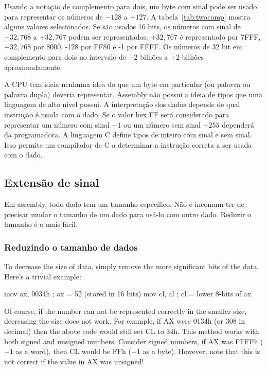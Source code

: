 Usando a notação de complemento para dois, um byte com sinal pode ser usado para
representar os números de $-128$ a $+127$. A tabela~\ref{tab:twocomp} mostra alguns
valores selecionados. Se são usados 16 bits, os números com sinal de $-32,768$ a 
$+32,767$ podem ser representados. $+32,767$ é representado por 7FFF, 
$-32,768$ por 8000, -128 por FF80 e -1 por FFFF. Os números de 32 bit em complemento 
para dois no intervalo de $-2$ bilhões a $+2$ bilhões aproximadamente. 


A CPU tem ideia nenhuma idea do que um byte em particular (ou palavra ou palavra dupla) 
deveria representar. Assembly não possui a ideia de tipos que uma
linguagem de alto nível possui. A interpretação dos dados depende de qual instrução
é usada com o dado. Se o valor hex FF será considerado para representar
um número com sinal $-1$ ou um número sem sinal $+255$ dependerá da programadora. A linguagem C 
define tipos de inteiro com sinal e sem sinal. Isso permite um compilador de C a 
determinar a instrução correta a ser usada com o dado.


\subsection{Extensão de sinal }

Em assembly, todo dado tem um tamanho específico. Não é incomum ter de precisar 
mudar o tamanho de um dado para usá-lo com outro dado. Reduzir o tamanho é o 
mais fácil.

\subsubsection{Reduzindo o tamanho de dados}

To decrease the size of data, simply remove the more significant bits of the
data. Here's a trivial example:
\begin{AsmCodeListing}[numbers=none,frame=none]
      mov    ax, 0034h      ; ax = 52 (stored in 16 bits)
      mov    cl, al         ; cl = lower 8-bits of ax
\end{AsmCodeListing}

Of course, if the number can not be represented correctly in the smaller
size, decreasing the size does not work. For example, if {\code AX}
were 0134h (or 308 in decimal) then the above code would still set
{\code CL} to 34h. This method works with both signed and unsigned
numbers.  Consider signed numbers, if {\code AX} was FFFFh ($-1$ as a
word), then {\code CL} would be FFh ($-1$ as a byte). However, note
that this is not correct if the value in {\code AX} was unsigned!

